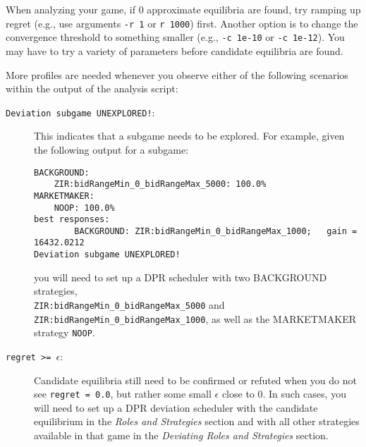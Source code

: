 \documentclass[11pt]{article}
\begin{document}
When analyzing your game, if 0 approximate equilibria are found, try ramping up regret (e.g., use arguments \verb|-r 1| or \verb|r 1000|) first.
Another option is to change the convergence threshold to something smaller (e.g., \verb|-c 1e-10| or \verb|-c 1e-12|). You may have to try a variety of parameters before candidate equilibria are found.

More profiles are needed whenever you observe either of the following scenarios within the output of the analysis script:
\begin{description}
\item[\texttt{Deviation subgame UNEXPLORED!}:] This indicates that a subgame needs to be explored.
For example, given the following output for a subgame:
\begin{verbatim}
BACKGROUND:
    ZIR:bidRangeMin_0_bidRangeMax_5000: 100.0%
MARKETMAKER:
    NOOP: 100.0%
best responses:
        BACKGROUND: ZIR:bidRangeMin_0_bidRangeMax_1000;   gain = 16432.0212
Deviation subgame UNEXPLORED!
\end{verbatim}
you will need to set up a DPR scheduler with two BACKGROUND strategies, \\
\verb|ZIR:bidRangeMin_0_bidRangeMax_5000| and \verb|ZIR:bidRangeMin_0_bidRangeMax_1000|, as well as the MARKETMAKER strategy \verb|NOOP|.

\item[\texttt{regret >= $\epsilon$}:] Candidate equilibria still need to be confirmed or refuted when you do not see \verb|regret = 0.0|, but rather some small $\epsilon$ close to 0. In such cases, you will need to set up a DPR deviation scheduler with the candidate equilibrium in the \emph{Roles and Strategies} section and with all other strategies available in that game in the \emph{Deviating Roles and Strategies} section.

\end{description}



\end{document}
